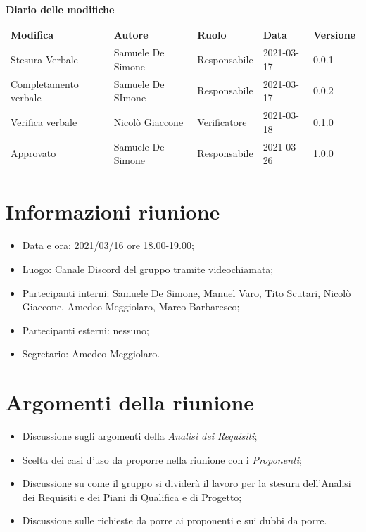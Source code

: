 \documentclass[a4paper]{article}
\begin{document}
    \begin{center}
        \textbf{\Large Diario delle modifiche}\\
        \vspace{10px}
        \begin{table}[h!]
        \centering
        \renewcommand{\arraystretch}{1.8}
        \begin{tabular}{p{150px} p{90px} p{60px} p{60px} p{45px}}
            \rowcolor{logo!70} \textbf{Modifica} & \textbf{Autore} & \textbf{Ruolo} & \textbf{Data} & \textbf{Versione}\\
            Stesura Verbale & Samuele De Simone & Responsabile & 2021-03-17 & 0.0.1 \\    
            Completamento verbale & Samuele De SImone & Responsabile & 2021-03-17 & 0.0.2\\
            Verifica verbale & Nicolò Giaccone & Verificatore & 2021-03-18 & 0.1.0\\
            Approvato & Samuele De Simone & Responsabile & 2021-03-26 & 1.0.0\\
        \end{tabular}
    \end{table}
    \end{center}

    \newpage
    \tableofcontents
    \newpage
    \section{Informazioni riunione}
    \begin{itemize}
        \item Data e ora: 2021/03/16 ore 18.00-19.00;
        \item Luogo: Canale Discord del gruppo tramite videochiamata;
        \item Partecipanti interni: Samuele De Simone, Manuel Varo, Tito Scutari, Nicolò Giaccone, Amedeo Meggiolaro, Marco Barbaresco;
        \item Partecipanti esterni: nessuno;
        \item Segretario: Amedeo Meggiolaro.
    \end{itemize}
    \section{Argomenti della riunione}
    \begin{itemize}
        \item Discussione sugli argomenti della \textit{Analisi dei Requisiti};
        \item Scelta dei casi d'uso da proporre nella riunione con i \textit{Proponenti};
        \item Discussione su come il gruppo si dividerà il lavoro per la stesura dell'Analisi dei Requisiti e dei Piani di Qualifica e di Progetto;
        \item Discussione sulle richieste da porre ai proponenti e sui dubbi da porre.
    \end{itemize}
\end{document}
